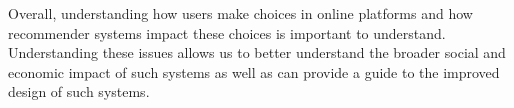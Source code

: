 \documentclass[format=acmsmall, review=false]{acmart}
\begin{document}
\par 
Overall, understanding how users make choices in online platforms and how recommender systems impact these choices is important to understand. Understanding these issues allows us to better understand the broader social and economic impact of such systems as well as can provide a guide to the improved design of such systems.


\end{document}
